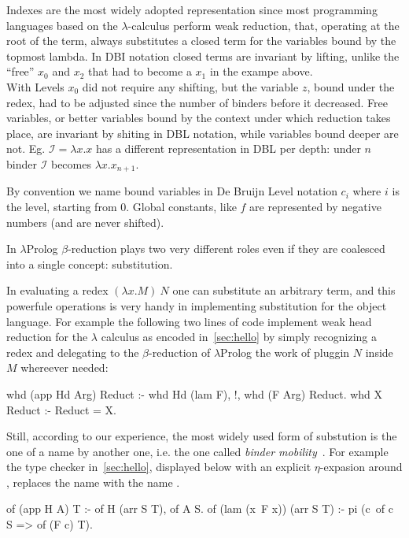 \documentclass[a4paper, 11pt]{book}
\begin{document}
Indexes are the most widely adopted representation since most programming
languages based on the $\lambda$-calculus perform weak reduction, that, operating
at the root of the term, always substitutes a closed term for the variables bound
by the topmost lambda. In DBI notation closed terms
are invariant by lifting, unlike the ``free'' $x_0$ and $x_2$ that had to
become a $x_1$ in the exampe above.\\
With Levels $x_0$ did not require any shifting, but the variable $z$, bound
under the redex, had to be adjusted since the number of binders before it
decreased. Free variables, or better variables bound by the context under
which reduction takes place, are invariant by shiting in DBL notation,
while variables bound deeper are not. Eg. $\mathcal{I} = \lambda x.x$ has a different
representation in DBL per depth: under $n$ binder $\mathcal{I}$ becomes
$\lambda x.x_{n+1}$.

By convention we name bound variables in De Bruijn Level notation $c_i$
where $i$ is the level, starting from $0$. Global constants, like $f$ are
represented by negative numbers (and are never shifted).

In $\lambda$Prolog $\beta$-reduction plays two very different roles even if
they are coalesced into a single concept: substitution.

In evaluating a redex $(\lambda x.M)\ N$ one can substitute an arbitrary term,
and this powerfule operations is very handy in implementing substitution for the object
language. For example the following two lines of code
implement weak head reduction for the $\lambda$ calculus as encoded
in~\cref{sec:hello} by simply recognizing a redex and delegating to the
$\beta$-reduction of $\lambda$Prolog the work of pluggin $N$ inside $M$
whereever needed:

\begin{elpicode}
whd (app Hd Arg) Reduct :- whd Hd (lam F), !, whd (F Arg) Reduct.
whd X Reduct :- Reduct = X.
\end{elpicode}

Still, according to our experience, the most widely used form of substution
is the one of a name by another one, i.e. the one called
\emph{binder mobility}~\cite{Miller2018MechanizedMR}. For example the
type checker in~\cref{sec:hello}, displayed below with an
explicit $\eta$-expasion around , replaces the name  with
the name .

\begin{elpicode}
of (app H A) T :- of H (arr S T), of A S.
of (lam (x\ F x)) (arr S T) :- pi (c\ of c S => of (F c) T).
\end{elpicode}
\end{document}
